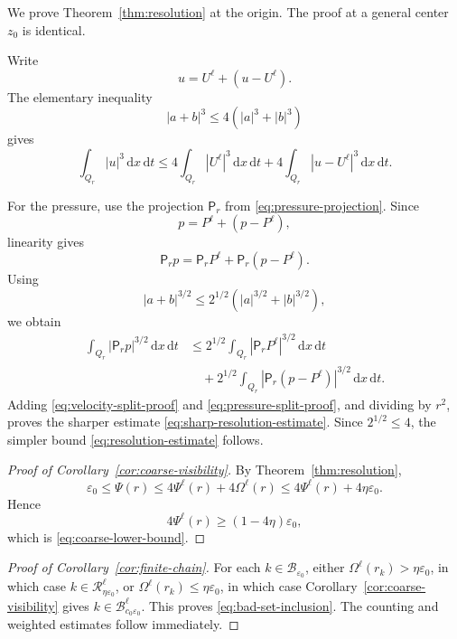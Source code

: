 \documentclass[11pt]{article}
\numberwithin{equation}{section}
\newcommand{\eps}{\varepsilon}
\newcommand{\dxdt}{\,\mathrm dx\,\mathrm dt}
\newcommand{\Pf}{\mathsf P}
\begin{document}
We prove Theorem~\ref{thm:resolution} at the origin.  The proof at a general center $z_0$ is identical.

Write
\[
u=U^\ell+(u-U^\ell).
\]
The elementary inequality
\begin{equation}\label{eq:p-power-ineq-3}
|a+b|^3\le 4(|a|^3+|b|^3)
\end{equation}
gives
\begin{equation}\label{eq:velocity-split-proof}
\int_{Q_r}|u|^3\dxdt
\le
4\int_{Q_r}|U^\ell|^3\dxdt
+
4\int_{Q_r}|u-U^\ell|^3\dxdt.
\end{equation}

For the pressure, use the projection $\Pf_r$ from \eqref{eq:pressure-projection}.  Since
\[
p=P^\ell+(p-P^\ell),
\]
linearity gives
\begin{equation}\label{eq:pressure-exact-split}
\Pf_r p=\Pf_r P^\ell+\Pf_r(p-P^\ell).
\end{equation}
Using
\begin{equation}\label{eq:p-power-ineq-32}
|a+b|^{3/2}\le 2^{1/2}\left(|a|^{3/2}+|b|^{3/2}\right),
\end{equation}
we obtain
\begin{align}\label{eq:pressure-split-proof}
\int_{Q_r}|\Pf_r p|^{3/2}\dxdt
&\le
2^{1/2}\int_{Q_r}|\Pf_r P^\ell|^{3/2}\dxdt
\nonumber\\
&\quad+
2^{1/2}\int_{Q_r}|\Pf_r(p-P^\ell)|^{3/2}\dxdt.
\end{align}
Adding \eqref{eq:velocity-split-proof} and \eqref{eq:pressure-split-proof}, and dividing by $r^2$, proves the sharper estimate \eqref{eq:sharp-resolution-estimate}.  Since $2^{1/2}\le4$, the simpler bound \eqref{eq:resolution-estimate} follows.

\begin{proof}[Proof of Corollary~\ref{cor:coarse-visibility}]
By Theorem~\ref{thm:resolution},
\[
\eps_0\le\Psi(r)\le4\Psi^\ell(r)+4\Omega^\ell(r)
\le4\Psi^\ell(r)+4\eta\eps_0.
\]
Hence
\[
4\Psi^\ell(r)\ge(1-4\eta)\eps_0,
\]
which is \eqref{eq:coarse-lower-bound}.
\end{proof}

\begin{proof}[Proof of Corollary~\ref{cor:finite-chain}]
For each $k\in\mathcal B_{\eps_0}$, either $\Omega^\ell(r_k)>\eta\eps_0$, in which case $k\in\mathcal R^\ell_{\eta\eps_0}$, or $\Omega^\ell(r_k)\le\eta\eps_0$, in which case Corollary~\ref{cor:coarse-visibility} gives $k\in\mathcal B^\ell_{c_0\eps_0}$.  This proves \eqref{eq:bad-set-inclusion}.  The counting and weighted estimates follow immediately.
\end{proof}
\end{document}
